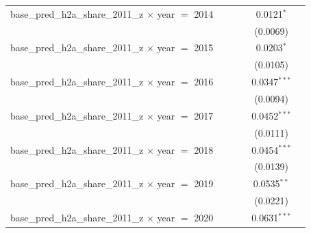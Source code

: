 \begin{tabular}{lccccc}
   base\_pred\_h2a\_share\_2011\_z $\times$ year $=$ 2014       &                    &                 &                       & 0.0121$^{*}$               &   \\   
                                                                &                    &                 &                       & (0.0069)                   &   \\   
   base\_pred\_h2a\_share\_2011\_z $\times$ year $=$ 2015       &                    &                 &                       & 0.0203$^{*}$               &   \\   
                                                                &                    &                 &                       & (0.0105)                   &   \\   
   base\_pred\_h2a\_share\_2011\_z $\times$ year $=$ 2016       &                    &                 &                       & 0.0347$^{***}$             &   \\   
                                                                &                    &                 &                       & (0.0094)                   &   \\   
   base\_pred\_h2a\_share\_2011\_z $\times$ year $=$ 2017       &                    &                 &                       & 0.0452$^{***}$             &   \\   
                                                                &                    &                 &                       & (0.0111)                   &   \\   
   base\_pred\_h2a\_share\_2011\_z $\times$ year $=$ 2018       &                    &                 &                       & 0.0454$^{***}$             &   \\   
                                                                &                    &                 &                       & (0.0139)                   &   \\   
   base\_pred\_h2a\_share\_2011\_z $\times$ year $=$ 2019       &                    &                 &                       & 0.0535$^{**}$              &   \\   
                                                                &                    &                 &                       & (0.0221)                   &   \\   
   base\_pred\_h2a\_share\_2011\_z $\times$ year $=$ 2020       &                    &                 &                       & 0.0631$^{***}$             &   \\   

\end{tabular}
